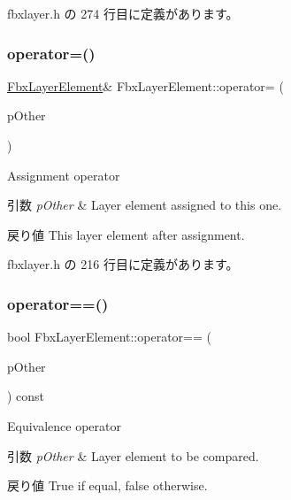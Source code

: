  fbxlayer.\+h の 274 行目に定義があります。

\mbox{\label{class_fbx_layer_element_a86eb3d2fb38fe2624b4e00369d6a25ea}} 
\subsubsection{\texorpdfstring{operator=()}{operator=()}}
{\footnotesize\ttfamily \hyperlink{class_fbx_layer_element}{Fbx\+Layer\+Element}\& Fbx\+Layer\+Element\+::operator= (\begin{DoxyParamCaption}\item[{\hyperlink{class_fbx_layer_element}{Fbx\+Layer\+Element} const \&}]{p\+Other }\end{DoxyParamCaption})\hspace{0.3cm}{\ttfamily [inline]}}

Assignment operator 
\begin{DoxyParams}{引数}
{\em p\+Other} & Layer element assigned to this one. \\
\hline
\end{DoxyParams}
\begin{DoxyReturn}{戻り値}
This layer element after assignment. 
\end{DoxyReturn}


 fbxlayer.\+h の 216 行目に定義があります。

\mbox{\label{class_fbx_layer_element_a3ee62705102c228619427b17361073b7}} 
\subsubsection{\texorpdfstring{operator==()}{operator==()}}
{\footnotesize\ttfamily bool Fbx\+Layer\+Element\+::operator== (\begin{DoxyParamCaption}\item[{const \hyperlink{class_fbx_layer_element}{Fbx\+Layer\+Element} \&}]{p\+Other }\end{DoxyParamCaption}) const\hspace{0.3cm}{\ttfamily [inline]}}

Equivalence operator 
\begin{DoxyParams}{引数}
{\em p\+Other} & Layer element to be compared. \\
\hline
\end{DoxyParams}
\begin{DoxyReturn}{戻り値}
{\ttfamily True} if equal, {\ttfamily false} otherwise. 
\end{DoxyReturn}



